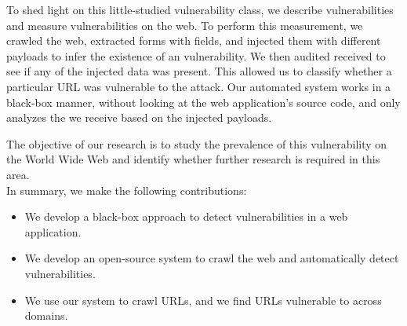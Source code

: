 To shed light on this little-studied vulnerability class, we describe \ehi vulnerabilities and measure \ehi vulnerabilities on the web. To perform this measurement, we crawled the web, extracted forms with \email fields, and injected them with different payloads to infer the existence of an \ehi vulnerability. We then audited received \emails to see if any of the injected data was present. This allowed us to classify whether a particular URL was vulnerable to the attack. Our automated system works in a black-box manner, without looking at the web application's source code, and only analyzes the \emails we receive based on the injected payloads.

The objective of our research is to study the prevalence of this vulnerability on the World Wide Web and identify whether further research is required in this area.
\\

\noindent{}In summary, we make the following contributions:
\begin{itemize}

\item We develop a black-box approach to detect \ehi vulnerabilities in a web application.

\item We develop an open-source system to crawl the web and automatically detect \ehi vulnerabilities.

\item We use our system to crawl \urls URLs, and we find \success URLs vulnerable to \ehi across \domains domains. 

\end{itemize}
